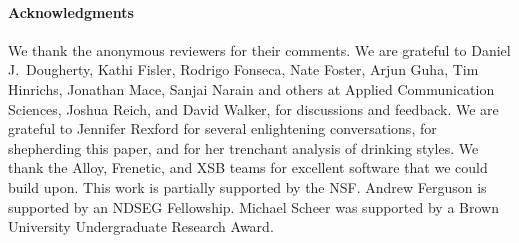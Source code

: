 \paragraph{Acknowledgments}

We thank the anonymous reviewers for their comments. We are grateful to
Daniel J.\ Dougherty, Kathi Fisler, Rodrigo Fonseca, Nate Foster, Arjun Guha, 
Tim Hinrichs, Jonathan Mace, Sanjai Narain and others at Applied
Communication Sciences, Joshua Reich, and David Walker, for
discussions and feedback. We are grateful to Jennifer Rexford for several
enlightening conversations, for shepherding this paper, and for her
trenchant analysis of drinking styles.
We thank the Alloy, Frenetic, and XSB teams for excellent software that we
could build upon. This work is
partially supported by the NSF. Andrew Ferguson is supported by an NDSEG
Fellowship. Michael Scheer was supported by a Brown University
Undergraduate Research Award.

